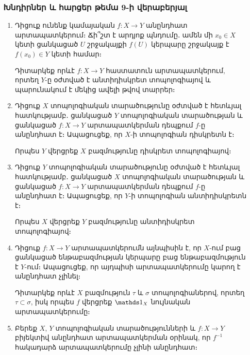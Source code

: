 \bigskip
\bigskip
\subsubsection*{Խնդիրներ և հարցեր թեմա 9-ի վերաբերյալ}

\begin{enumerate}[label=\thesection.\arabic*.]

\item Դիցուք ունենք կամայական $f: X \to Y$ անընդհատ արտապատկերում։ Ճի՞շտ է արդյոք պնդումը․ ամեն մի $x_0 \in X$ կետի ցանկացած $U$ շրջակայքի $f(U)$ կերպարը շրջակայք է $f(x_0) \in Y$ կետի համար։

\begin{hint}
Դիտարկեք որևէ $f: X \to Y$ հաստատուն արտապատկերում, որ\-տեղ $Y$-ը օժտված է անտիդիսկրետ տոպոլոգիայով և պարունակում է մեկից ավելի թվով տարրեր։
\end{hint}

\item Դիցուք $X$ տոպոլոգիական տարածությունը օժտված է հետևյալ հատկությամբ․ ցանկացած $Y$ տոպոլոգիական տարածության և ցանկացած $f: X \to Y$ արտա\-պատկերման դեպքում $f$-ը անընդհատ է։ Ապացուցեք, որ $X$-ի տոպոլո\-գիան դիսկրետն է։

\begin{hint}
Որպես $Y$ վերցրեք $X$ բազմությունը դիսկրետ տոպոլոգիայով։
\end{hint}

\item Դիցուք $Y$ տոպոլոգիական տարածությունը օժտված է հետևյալ հատկությամբ․ ցանկացած $X$ տոպոլոգիական տարածության և ցանկացած $f: X \to Y$ արտա\-պատկերման դեպքում $f$-ը անընդհատ է։ Ապացուցեք, որ $Y$-ի տոպոլո\-գիան անտիդիսկրետն է։

\begin{hint}
Որպես $X$ վերցրեք $Y$ բազմությունը անտիդիսկրետ տոպոլոգիա\-յով։
\end{hint}

\item Դիցուք $f: X \to Y$ արտապատկերումն այնպիսին է, որ $X$-ում բաց ցանկացած ենթաբազմության կերպարը բաց ենթաբազմություն է $Y$-ում։ Ապացուցեք, որ այդպիսի արտապատկերումը կարող է անընդհատ չլինել։

\begin{hint}
Դիտարկեք որևէ $X$ բազմություն $\tau$ և $\sigma$ տոպոլոգիաներով, որտեղ $\tau \subset \sigma$, իսկ որպես $f$ վերցրեք $\nuynakan_X$ նույնական արտապատկերումը։
\end{hint}

\item Բերեք $X$, $Y$ տոպոլոգիական տարածությունների և $f: X \to Y$ բիյեկտիվ ան\-ընդհատ արտապատկերման օրինակ, որ $f^{-1}$ հակադարձ արտապատկերումը չլինի անընդհատ։


\end{enumerate}
